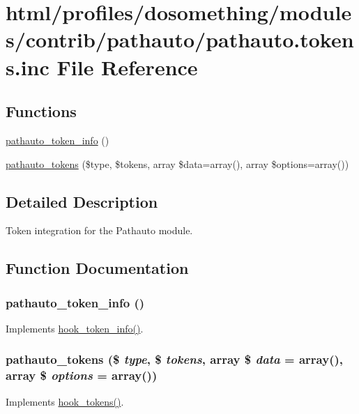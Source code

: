 \hypertarget{pathauto_8tokens_8inc}{
\section{html/profiles/dosomething/modules/contrib/pathauto/pathauto.tokens.inc File Reference}
\label{pathauto_8tokens_8inc}
}
\subsection*{Functions}
\begin{DoxyCompactItemize}
\item 
\hyperlink{pathauto_8tokens_8inc_ac790722eaf667d014fe3d1705760709a}{pathauto\_\-token\_\-info} ()
\item 
\hyperlink{pathauto_8tokens_8inc_a0d9fa3ac8d646480cb5a15c442da6176}{pathauto\_\-tokens} (\$type, \$tokens, array \$data=array(), array \$options=array())
\end{DoxyCompactItemize}


\subsection{Detailed Description}
Token integration for the Pathauto module. 

\subsection{Function Documentation}
\hypertarget{pathauto_8tokens_8inc_ac790722eaf667d014fe3d1705760709a}{
\subsubsection[{pathauto\_\-token\_\-info}]{\setlength{\rightskip}{0pt plus 5cm}pathauto\_\-token\_\-info ()}}
\label{pathauto_8tokens_8inc_ac790722eaf667d014fe3d1705760709a}
Implements \hyperlink{group__hooks_gab868597197cf36911f95dcd29ae0b954}{hook\_\-token\_\-info()}. \hypertarget{pathauto_8tokens_8inc_a0d9fa3ac8d646480cb5a15c442da6176}{
\subsubsection[{pathauto\_\-tokens}]{\setlength{\rightskip}{0pt plus 5cm}pathauto\_\-tokens (\$ {\em type}, \/  \$ {\em tokens}, \/  array \$ {\em data} = {\ttfamily array()}, \/  array \$ {\em options} = {\ttfamily array()})}}
\label{pathauto_8tokens_8inc_a0d9fa3ac8d646480cb5a15c442da6176}
Implements \hyperlink{group__hooks_ga3bfd87d9a19b2397b0f970e1cff7ea4f}{hook\_\-tokens()}. 